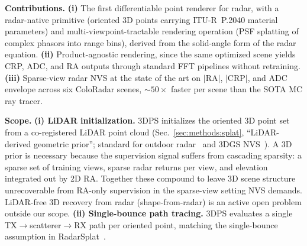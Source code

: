 \textbf{Contributions.} \textbf{(i)} The first differentiable point renderer for radar, with a radar-native primitive (oriented 3D points carrying ITU-R~P.2040 material parameters) and multi-viewpoint-tractable rendering operation (PSF splatting of complex phasors into range bins), derived from the solid-angle form of the radar equation. \textbf{(ii)} Product-agnostic rendering, since the same optimized scene yields CRP, ADC, and RA outputs through standard FFT pipelines without retraining. \textbf{(iii)} Sparse-view radar NVS at the state of the art on $|\mathrm{RA}|$, $|\mathrm{CRP}|$, and ADC envelope across six ColoRadar scenes, ${\sim}50\times$ faster per scene than the SOTA MC ray tracer.

\textbf{Scope.} \textbf{(i) LiDAR initialization.} 3DPS initializes the oriented 3D point set from a co-registered LiDAR point cloud (Sec.~\ref{sec:methods:splat}, ``LiDAR-derived geometric prior''; standard for outdoor radar~\cite{kung2025radarsplat, mmIR2026, kramer2022coloradar} and 3DGS NVS~\cite{xiong2023sparsegs, yan2024streetgaussians}). A 3D prior is necessary because the supervision signal suffers from cascading sparsity: a sparse set of training views, sparse radar returns per view, and elevation integrated out by 2D RA. Together these compound to leave 3D scene structure unrecoverable from RA-only supervision in the sparse-view setting NVS demands. LiDAR-free 3D recovery from radar (shape-from-radar) is an active open problem outside our scope. \textbf{(ii) Single-bounce path tracing.} 3DPS evaluates a single TX$\to$scatterer$\to$RX path per oriented point, matching the single-bounce assumption in RadarSplat~\cite{kung2025radarsplat}.
